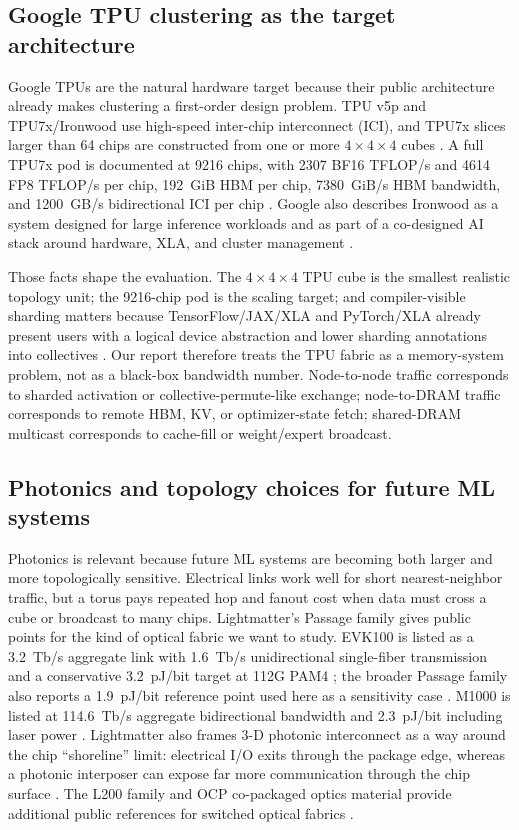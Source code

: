 \documentclass[conference]{IEEEtran}
\newcommand{\pjbit}{pJ/bit}
\newcommand{\tbps}{Tb/s}
\begin{document}
\subsection{Google TPU clustering as the target architecture}
Google TPUs are the natural hardware target because their public
architecture already makes clustering a first-order design problem.
TPU v5p and TPU7x/Ironwood use high-speed inter-chip interconnect
(ICI), and TPU7x slices larger than 64 chips are constructed from
one or more $4{\times}4{\times}4$ cubes \cite{tpu7x,tpuv5p}. A full
TPU7x pod is documented at 9216 chips, with 2307 BF16 TFLOP/s and
4614 FP8 TFLOP/s per chip, 192~GiB HBM per chip, 7380~GiB/s HBM
bandwidth, and 1200~GB/s bidirectional ICI per chip
\cite{tpu7x}. Google also describes Ironwood as a system designed
for large inference workloads and as part of a co-designed AI stack
around hardware, XLA, and cluster management
\cite{ironwood-blog,hotchips-ironwood}.

Those facts shape the evaluation. The $4{\times}4{\times}4$ TPU
cube is the smallest realistic topology unit; the 9216-chip pod is
the scaling target; and compiler-visible sharding matters because
TensorFlow/JAX/XLA and PyTorch/XLA already present users with a
logical device abstraction and lower sharding annotations into
collectives \cite{xla-spmd}. Our report therefore treats the TPU
fabric as a memory-system problem, not as a black-box bandwidth
number. Node-to-node traffic corresponds to sharded activation or
collective-permute-like exchange; node-to-DRAM traffic corresponds
to remote HBM, KV, or optimizer-state fetch; shared-DRAM multicast
corresponds to cache-fill or weight/expert broadcast.

\subsection{Photonics and topology choices for future ML systems}
Photonics is relevant because future ML systems are becoming both
larger and more topologically sensitive. Electrical links work well
for short nearest-neighbor traffic, but a torus pays repeated hop
and fanout cost when data must cross a cube or broadcast to many
chips. Lightmatter's Passage family gives public points for the
kind of optical fabric we want to study. EVK100 is listed as a
3.2~\tbps{} aggregate link with 1.6~\tbps{} unidirectional
single-fiber transmission and a conservative 3.2~\pjbit{} target at
112G PAM4 \cite{lightmatter-evk100}; the broader Passage family
also reports a 1.9~\pjbit{} reference point used here as a
sensitivity case \cite{lightmatter-passage}. M1000 is listed at
114.6~\tbps{} aggregate bidirectional bandwidth and 2.3~\pjbit{}
including laser power \cite{lightmatter-m1000}. Lightmatter also
frames 3-D photonic interconnect as a way around the chip
``shoreline'' limit: electrical I/O exits through the package edge,
whereas a photonic interposer can expose far more communication
through the chip surface \cite{lightmatter-m1000}. The L200 family
and OCP co-packaged optics material provide additional public
references for switched optical fabrics \cite{lightmatter-l200,
lightmatter-ocp,lightmatter-tco}.
\end{document}
